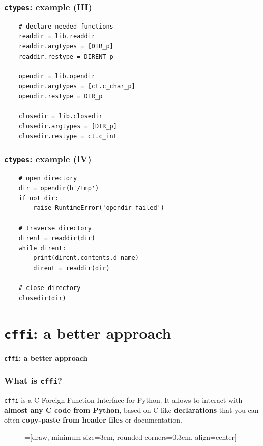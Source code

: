 \documentclass[handout]{beamer}
\begin{document}
\begin{frame}[fragile]
  \frametitle{\texttt{ctypes}: example (III)}

  \begin{verbatim}
    # declare needed functions
    readdir = lib.readdir
    readdir.argtypes = [DIR_p]
    readdir.restype = DIRENT_p

    opendir = lib.opendir
    opendir.argtypes = [ct.c_char_p]
    opendir.restype = DIR_p

    closedir = lib.closedir
    closedir.argtypes = [DIR_p]
    closedir.restype = ct.c_int
  \end{verbatim}
\end{frame}

\begin{frame}[fragile]
  \frametitle{\texttt{ctypes}: example (IV)}

  \begin{verbatim}
    # open directory
    dir = opendir(b'/tmp')
    if not dir:
        raise RuntimeError('opendir failed')

    # traverse directory
    dirent = readdir(dir)
    while dirent:
        print(dirent.contents.d_name)
        dirent = readdir(dir)

    # close directory
    closedir(dir)
  \end{verbatim}
\end{frame}

\section{\texttt{cffi}: a better approach}

\begin{frame}[plain]{}
  \begin{center}
    \Huge \textbf{\texttt{cffi}: a better approach}
  \end{center}
\end{frame}

\begin{frame}
  \frametitle{What is \texttt{cffi}?}

  \texttt{cffi} is a C Foreign Function Interface for Python. It allows to
  interact with \textbf{almost any C code from Python}, based on C-like
  \textbf{declarations} that you can often \textbf{copy-paste from header files}
  or documentation.

  \begin{figure}
    \centering
    =[draw, minimum size=3em, rounded corners=0.3em, align=center]

  \end{figure}
\end{frame}
\end{document}
